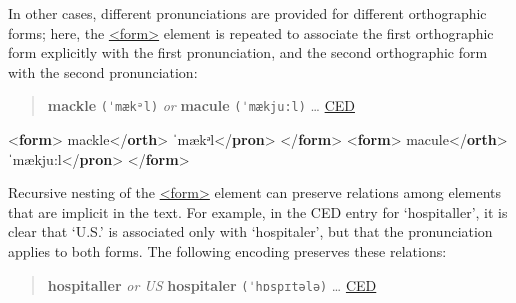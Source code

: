 In other cases, different pronunciations are provided for different orthographic forms; here, the \hyperref[TEI.form]{<form>} element is repeated to associate the first orthographic form explicitly with the first pronunciation, and the second orthographic form with the second pronunciation:
\begin{quote}{\bfseries mackle} \texttt{(ˈmækᵊl)} {\itshape or} {\bfseries macule} \texttt{(ˈmækju:l)} … \hyperref[DIC-CED]{CED}\end{quote}
 \par\bgroup{}\exampleFont \begin{shaded}\noindent\mbox{}{<\textbf{form}>}\mbox{}\newline 
{}mackle{</\textbf{orth}>}\mbox{}\newline 
{}ˈmækᵊl{</\textbf{pron}>}\mbox{}\newline 
{</\textbf{form}>}\mbox{}\newline 
{<\textbf{form}>}\mbox{}\newline 
{}macule{</\textbf{orth}>}\mbox{}\newline 
{}ˈmækju:l{</\textbf{pron}>}\mbox{}\newline 
{</\textbf{form}>}\end{shaded}\egroup\par \par
Recursive nesting of the \hyperref[TEI.form]{<form>} element can preserve relations among elements that are implicit in the text. For example, in the CED entry for ‘hospitaller’, it is clear that ‘U.S.’ is associated only with ‘hospitaler’, but that the pronunciation applies to both forms. The following encoding preserves these relations:
\begin{quote}{\bfseries hospitaller} {\itshape or US} {\bfseries hospitaler} \texttt{(ˈhɒspɪtələ)} … \hyperref[DIC-CED]{CED}\end{quote}
